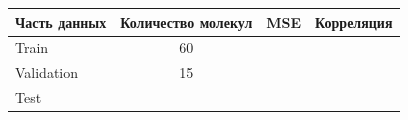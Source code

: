 \documentclass[12pt,twosides]{article}
\begin{document}
	\begin{table}[H]
	\centering
	\begin{tabular}{lcrc}
		\hline Часть данных & Количество молекул & MSE & Корреляция \\
		\hline Train & 60 &  & \\
		Validation & 15 &  &  \\
		Test &  &  &  \\
		\hline
	\end{tabular}
	\end{table}
	
	
	
	\nocite{*}
	
	
\end{document}
